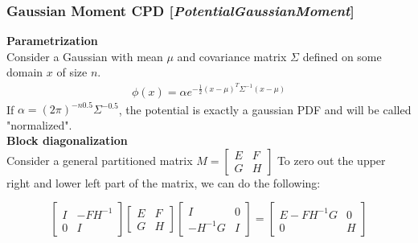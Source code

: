 \documentclass[11pt]{article}
\newcommand{\nllref}[1]{[\small{\textit{#1}}]}
\newcommand{\subsubsubsection}[1]{\noindent\textbf{#1}\\}
\begin{document}
\subsubsection{Gaussian Moment CPD \nllref{PotentialGaussianMoment}}
\subsubsubsection{Parametrization}
Consider a Gaussian with mean $\mu$ and covariance matrix $\Sigma$ defined on some domain $x$ of size $n$.
\begin{align*}
\phi(x) = \alpha  e^{-\frac{1}{2}(x-\mu)^T\Sigma^{-1}(x-\mu)}
\end{align*}
If $\alpha = (2\pi)^{-n0.5} \Sigma^{-0.5}$, the potential is exactly a gaussian PDF and will be called "normalized".\\


\subsubsubsection{Block diagonalization}
Consider a general partitioned matrix $M= \left[ \begin{array}{cc} E & F \\ G & H \end{array} \right]$ To zero out the upper right and lower left part of the matrix, we can do the following:

$$
\left[ \begin{array}{cc} I & -FH^{-1} \\ 0 & I \end{array} \right]
\left[ \begin{array}{cc} E & F \\ G & H \end{array} \right]
\left[ \begin{array}{cc} I & 0 \\ -H^{-1}G & I \end{array} \right]
=
\left[ \begin{array}{cc} E-FH^{-1}G & 0 \\ 0 & H \end{array} \right]
$$
\end{document}
